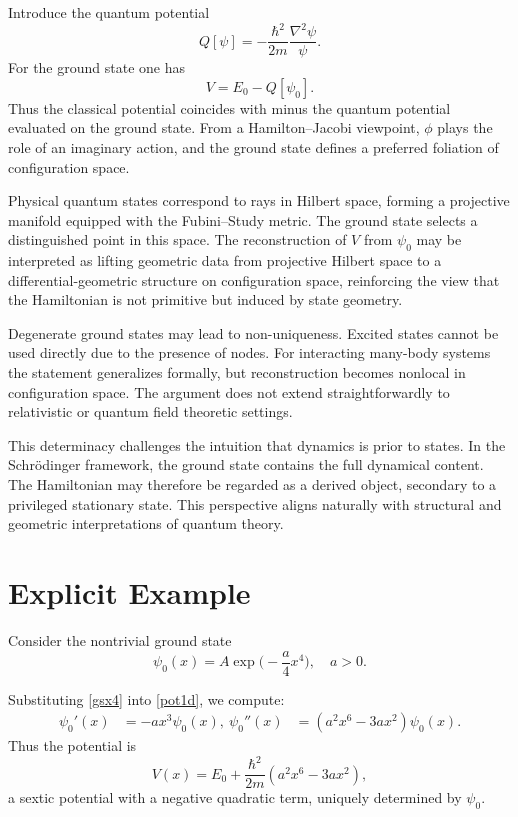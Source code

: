 Introduce the quantum potential
\begin{equation}
Q[\psi] = -\frac{\hbar^2}{2m}\frac{\nabla^2\psi}{\psi}.
\end{equation}
For the ground state one has
\begin{equation}
V = E_0 - Q[\psi_0].
\end{equation}
Thus the classical potential coincides with minus the quantum potential evaluated on the ground state. From a Hamilton--Jacobi viewpoint, $\phi$ plays the role of an imaginary action, and the ground state defines a preferred foliation of configuration space.

Physical quantum states correspond to rays in Hilbert space, forming a projective manifold equipped with the Fubini--Study metric. The ground state selects a distinguished point in this space. The reconstruction of $V$ from $\psi_0$ may be interpreted as lifting geometric data from projective Hilbert space to a differential-geometric structure on configuration space, reinforcing the view that the Hamiltonian is not primitive but induced by state geometry.

Degenerate ground states may lead to non-uniqueness. Excited states cannot be used directly due to the presence of nodes. For interacting many-body systems the statement generalizes formally, but reconstruction becomes nonlocal in configuration space. The argument does not extend straightforwardly to relativistic or quantum field theoretic settings.

This determinacy challenges the intuition that dynamics is prior to states. In the Schr\"odinger framework, the ground state contains the full dynamical content. The Hamiltonian may therefore be regarded as a derived object, secondary to a privileged stationary state. This perspective aligns naturally with structural and geometric interpretations of quantum theory.


\section{Explicit Example}

Consider the nontrivial ground state
\begin{equation}
    \label{gsx4}
\psi_0(x) = A \exp\Big(-\frac{a}{4} x^4\Big), \quad a>0.
\end{equation}

Substituting \eqref{gsx4} into \eqref{pot1d}, we compute:
\begin{align*}
\psi_0'(x) &= -a x^3 \psi_0(x), \
\psi_0''(x) &= (a^2 x^6 - 3 a x^2) \psi_0(x).
\end{align*}
Thus the potential is
\begin{equation}
V(x) = E_0 + \frac{\hbar^2}{2m} (a^2 x^6 - 3 a x^2),
\end{equation}
a sextic potential with a negative quadratic term, uniquely determined by $\psi_0$.

